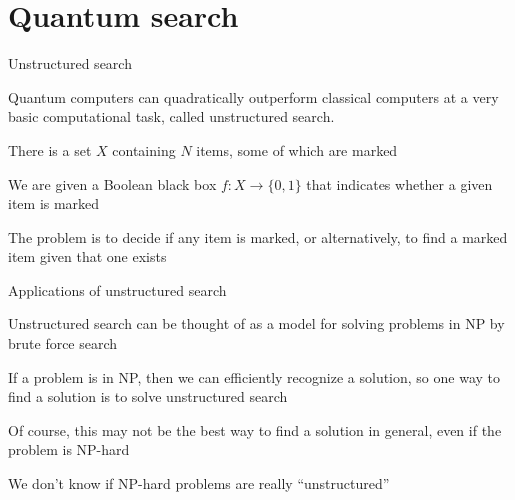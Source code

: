 \part{Quantum search}\label{part:search}

\begin{frame}
  \partpage
\end{frame}




\begin{frame}{Unstructured search}

Quantum computers can quadratically outperform classical computers at a very basic computational 
task, called unstructured search.

\bigskip
There is a set $X$ containing $N$ items, some of which are marked

\bigskip
We are given a Boolean black box $f : X \rightarrow \{0,1\}$ that indicates whether a given item is marked

\bigskip
The problem is to decide if any item is marked, or alternatively, to find a marked item given that one exists

\end{frame}




\begin{frame}{Applications of unstructured search}

Unstructured search can be thought of as a model for solving problems in NP by brute force search

\bigskip
If a problem is in NP, then we can efficiently recognize a solution, so one way to find a solution is to solve unstructured search

\bigskip
Of course, this may not be the best way to find a solution in general, even if the problem is NP-hard

\bigskip
We don't know if NP-hard problems are really ``unstructured''
\end{frame}

